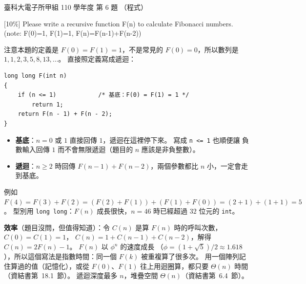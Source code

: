 \begin{pastexam}[label={px:ntust-110-ete-ds-06}]{臺科大電子所甲組 110 學年度 第 6 題}
（程式）

{[}10\%{]} Please write a recursive function F(n) to calculate Fibonacci numbers.\\
(note: F(0)=1, F(1)=1, F(n)=F(n-1)+F(n-2))
\end{pastexam}

\begin{pastsoln}
注意本題的定義是 $F(0) = F(1) = 1$，不是常見的 $F(0) = 0$，所以數列是 $1, 1, 2, 3, 5, 8, 13,
\ldots$。 直接照定義寫成遞迴：
\begin{verbatim}
long long F(int n)
{
    if (n <= 1)            /* 基底：F(0) = F(1) = 1 */
        return 1;
    return F(n - 1) + F(n - 2);
}
\end{verbatim}
\begin{itemize}
\item \textbf{基底}：$n = 0$ 或 $1$ 直接回傳 $1$，遞迴在這裡停下來。 寫成 \texttt{n <= 1} 也順便讓
負數輸入回傳 $1$ 而不會無限遞迴（題目的 $n$ 應該是非負整數）。
\item \textbf{遞迴}：$n \ge 2$ 時回傳 $F(n-1) + F(n-2)$，兩個參數都比 $n$ 小，一定會走到基底。
\end{itemize}
例如 $F(4) = F(3) + F(2) = (F(2) + F(1)) + (F(1) + F(0)) = (2 + 1) + (1 + 1) = 5$。 型別用
\texttt{long long}：$F(n)$ 成長很快，$n = 46$ 時已經超過 $32$ 位元的 \texttt{int}。

\textbf{效率}（題目沒問，但值得知道）：令 $C(n)$ 是算 $F(n)$ 時的呼叫次數，$C(0) = C(1) = 1$，
$C(n) = 1 + C(n-1) + C(n-2)$，解得 $C(n) = 2F(n) - 1$。 $F(n)$ 以 $\phi^n$ 的速度成長
（$\phi = (1 + \sqrt5)/2 \approx 1.618$），所以這個寫法是指數時間：同一個 $F(k)$ 被重複算了很多次。
用一個陣列記住算過的值（記憶化），或從 $F(0)$、$F(1)$ 往上用迴圈算，都只要 $\Theta(n)$ 時間
（資結書第~18.1~節）。 遞迴深度最多 $n$，堆疊空間 $\Theta(n)$（資結書第~6.4~節）。
\end{pastsoln}
